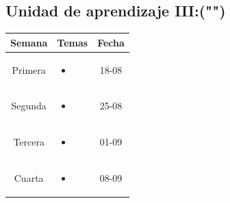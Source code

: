 \documentclass[a4paper]{article}
\begin{document}
\subsection{Unidad de aprendizaje III:("")}
\begin{table}[ht]
\centering
\begin{tabular}{|c|c|c|}
\hline
\textbf{Semana} & \textbf{Temas} & \textbf{Fecha} \\ 
\hline
Primera 
& \begin{minipage}[t]{10cm}
\begin{itemize}
\item 
\end{itemize}
\end{minipage} & 18-08\\ 
\hline 
Segunda 
& \begin{minipage}[t]{10cm}
\begin{itemize}
\item 
\end{itemize}
\end{minipage} & 25-08\\ 
\hline 
Tercera 
& \begin{minipage}[t]{10cm}
\begin{itemize}
\item 
\end{itemize}
\end{minipage} & 01-09 \\ 
\hline 
Cuarta 
& \begin{minipage}[t]{10cm}
\begin{itemize}
\item 
\end{itemize}
\end{minipage} & 08-09 \\ 
\hline 
\end{tabular}
\end{table}
\newpage
\end{document}
